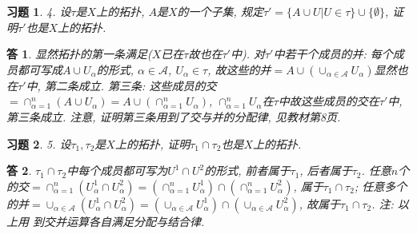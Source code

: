\documentclass{ctexart}%
\newtheorem*{exercise}{习题}
\newtheorem*{solution}{答}
\theoremstyle{definition}
\theoremstyle{remark}
\begin{document}
\begin{exercise}4. 设$\tau$是$X$上的拓扑, $A$是$X$的一个子集, 规定$\tau'=\{A\cup U|U\in \tau\}\cup \{\emptyset\}$, 证明$\tau'$也是$X$上的拓扑. 
\end{exercise}
\begin{solution} 显然拓扑的第一条满足($X$已在$\tau$故也在$\tau'$中). 对$\tau'$中若干个成员的并: 每个成员都可写成$A\cup U_\alpha$的形式, $\alpha\in \mathscr{A}$, $U_\alpha\in \tau$, 故这些的并$=A\cup\left(\cup_{\alpha\in \mathscr{A}} U_\alpha\right)$显然也在$\tau'$中, 第二条成立. 第三条: 这些成员的交$=\cap_{\alpha=1}^n\left(A\cup U_{\alpha}\right)=
A\cup\left(\cap_{\alpha=1}^n U_\alpha\right)$, $\cap_{\alpha=1}^n U_\alpha$在$\tau$中故这些成员的交在$\tau'$中, 第三条成立. 注意, 证明第三条用到了交与并的分配律, 见教材第8页. 
\end{solution}

\begin{exercise}5. 设$\tau_1,\tau_2$是$X$上的拓扑, 证明$\tau_1\cap\tau_2$也是$X$上的拓扑.
\end{exercise}
\begin{solution}$\tau_1\cap\tau_2$中每个成员都可写为$U^1\cap U^2$的形式, 前者属于$\tau_1$, 后者属于$\tau_2$. 任意$n$个的交$=\cap^{n}_{\alpha=1}\left(U^1_\alpha \cap U^2_\alpha\right)=\left(\cap^{n}_{\alpha=1}U^1_\alpha\right)\cap\left(\cap^{n}_{\alpha=1}U^2_\alpha\right)$, 属于$\tau_1\cap\tau_2$; 任意多个的并$=
\cup_{\alpha\in \mathscr{A}}\left(U^1_\alpha \cap U^2_\alpha\right)=\left(\cup_{\alpha\in \mathscr{A}}U^1_\alpha\right)\cap\left(\cup_{\alpha\in \mathscr{A}}U^2_\alpha\right)$,
故属于$\tau_1\cap\tau_2$. 注: 以上用
到交并运算各自满足分配与结合律.
\end{solution}
\end{document}
